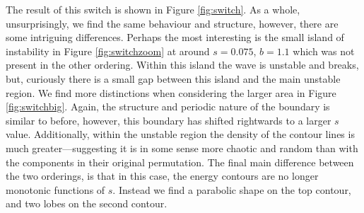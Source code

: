 The result of this switch is shown in Figure \ref{fig:switch}. As a whole, unsurprisingly, we find the same behaviour and structure, however, there are some intriguing differences. Perhaps the most interesting is the small island of instability in Figure \ref{fig:switchzoom} at around $s = 0.075$, $b = 1.1$ which was not present in the other ordering. Within this island the wave is unstable and breaks, but, curiously there is a small gap between this island and the main unstable region. We find more distinctions when considering the larger area in Figure \ref{fig:switchbig}. Again, the structure and periodic nature of the boundary is similar to before, however, this boundary has shifted rightwards to a larger $s$ value. Additionally, within the unstable region the density of the contour lines is much greater---suggesting it is in some sense more chaotic and random than with the components in their original permutation. The final main difference between the two orderings, is that in this case, the energy contours are no longer monotonic functions of $s$. Instead we find a parabolic shape on the top contour, and two lobes on the second contour.





